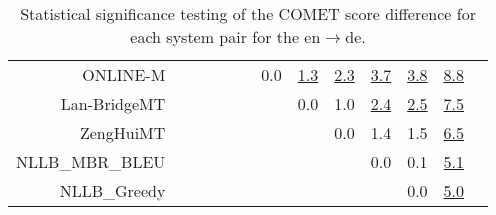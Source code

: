\documentclass[11pt]{article}
\begin{document}
\begin{sidewaystable}
\begin{center}
{\begin{tabular}{rcccccccccccc}
ONLINE-M &    &  &  &  &  & \cellcolor{red!0} 0.0 & \cellcolor{red!70} \underline{1.3} & \cellcolor{red!70} \underline{2.3} & \cellcolor{red!70} \underline{3.7} & \cellcolor{red!70} \underline{3.8} & \cellcolor{red!70} \underline{8.8}\\ 
Lan-BridgeMT &    &  &  &  &  &  & \cellcolor{red!0} 0.0 & \cellcolor{red!60} 1.0 & \cellcolor{red!70} \underline{2.4} & \cellcolor{red!70} \underline{2.5} & \cellcolor{red!70} \underline{7.5}\\ 
ZengHuiMT &  &    &  &  &  &  &  & \cellcolor{red!0} 0.0 & \cellcolor{red!70} 1.4 & \cellcolor{red!60} 1.5 & \cellcolor{red!70} \underline{6.5}\\ 
NLLB\_MBR\_BLEU &    &  &  &  &  &  &  &  & \cellcolor{red!0} 0.0 & \cellcolor{red!0} 0.1 & \cellcolor{red!70} \underline{5.1}\\ 
NLLB\_Greedy &  &    &  &  &  &  &  &  &  & \cellcolor{red!0} 0.0 & \cellcolor{red!70} \underline{5.0}\\ 
\bottomrule 
\end{tabular} }
\caption{Statistical significance testing of the COMET score difference for each system pair for the en$\rightarrow$de.} 
 \end{center} \end{sidewaystable} 
\end{document}
